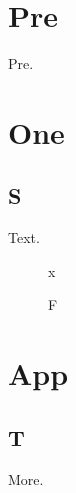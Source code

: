 \documentclass{scrbook}
\begin{document}
\frontmatter
\chapter{Pre}
Pre.
\mainmatter
\chapter{One}
\section{S}
Text.
\begin{figure}x\caption{F}\end{figure}
\appendix
\chapter{App}
\section{T}
More.
\end{document}
